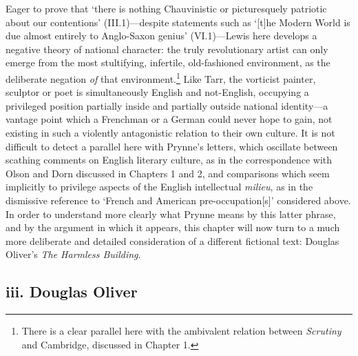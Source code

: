 \documentclass[]{article}
\begin{document}
\noindent Eager to prove that ‘there is nothing Chauvinistic or
picturesquely patriotic about our contentions’ (III.1)—despite
statements such as ‘{[}t{]}he Modern World is due almost entirely to
Anglo-Saxon genius’ (VI.1)—Lewis here develops a negative theory of
national character: the truly revolutionary artist can only emerge from
the most stultifying, infertile, old-fashioned environment, as the
deliberate negation \emph{of} that environment.\footnote{There is a
  clear parallel here with the ambivalent relation between
  \emph{Scrutiny} and Cambridge, discussed in Chapter 1.} Like Tarr, the
vorticist painter, sculptor or poet is simultaneously English and
not-English, occupying a privileged position partially inside and
partially outside national identity—a vantage point which a Frenchman or
a German could never hope to gain, not existing in such a violently
antagonistic relation to their own culture. It is not difficult to
detect a parallel here with Prynne’s letters, which oscillate between
scathing comments on English literary culture, as in the correspondence
with Olson and Dorn discussed in Chapters 1 and 2, and comparisons which
seem implicitly to privilege aspects of the English intellectual
\emph{milieu}, as in the dismissive reference to ‘French and American
pre-occupation{[}s{]}’ considered above. In order to understand more
clearly what Prynne means by this latter phrase, and by the argument in
which it appears, this chapter will now turn to a much more deliberate
and detailed consideration of a different fictional text: Douglas
Oliver’s \emph{The Harmless Building}.

\subsection{iii. Douglas Oliver}\label{iii.-douglas-oliver}
\end{document}
